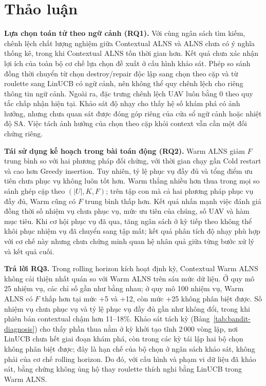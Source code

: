 \documentclass[11pt,a4paper]{article}
\begin{document}
\section{Thảo luận}\label{sec:discussion}
\textbf{Lựa chọn toán tử theo ngữ cảnh (RQ1).} Với cùng ngân sách tìm kiếm, chênh lệch chất lượng nghiệm giữa Contextual ALNS và ALNS chưa có ý nghĩa thống kê, trong khi Contextual ALNS tốn thời gian hơn. Kết quả chưa xác nhận lợi ích của toàn bộ cơ chế lựa chọn đề xuất ở cấu hình khảo sát. Phép so sánh đồng thời chuyển từ chọn destroy/repair độc lập sang chọn theo cặp và từ roulette sang LinUCB có ngữ cảnh, nên không thể quy chênh lệch cho riêng thông tin ngữ cảnh. Ngoài ra, đặc trưng chênh lệch UAV luôn bằng 0 theo quy tắc chấp nhận hiện tại. Khảo sát độ nhạy cho thấy hệ số khám phá có ảnh hưởng, nhưng chưa quan sát được đóng góp riêng của cửa sổ ngữ cảnh hoặc nhiệt độ SA. Việc tách ảnh hưởng của chọn theo cặp khỏi context vẫn cần một đối chứng riêng.

\textbf{Tái sử dụng kế hoạch trong bài toán động (RQ2).} Warm ALNS giảm $F$ trung bình so với hai phương pháp đối chứng, với thời gian chạy gần Cold restart và cao hơn Greedy insertion. Tuy nhiên, tỷ lệ phục vụ đầy đủ và tổng điểm ưu tiên chưa phục vụ không luôn tốt hơn. Warm thắng nhiều hơn thua trong mọi so sánh ghép cặp theo $(|U|,K,F)$; trên tập con mà cả hai phương pháp phục vụ đầy đủ, Warm cũng có $F$ trung bình thấp hơn. Kết quả nhấn mạnh việc đánh giá đồng thời số nhiệm vụ chưa phục vụ, mức ưu tiên của chúng, số UAV và hàm mục tiêu. Khi cơ hội phục vụ đã qua, tăng ngân sách ở kỳ tiếp theo không thể khôi phục nhiệm vụ đã chuyển sang tập mất; kết quả phân tích độ nhạy phù hợp với cơ chế này nhưng chưa chứng minh quan hệ nhân quả giữa từng bước xử lý và kết quả cuối.

\textbf{Trả lời RQ3.} Trong rolling horizon kích hoạt định kỳ, Contextual Warm ALNS không cải thiện nhất quán so với Warm ALNS trên sáu mức dữ liệu. Ở quy mô 25 nhiệm vụ, các chỉ số gần như bằng nhau; ở quy mô 100 nhiệm vụ, Warm ALNS có $F$ thấp hơn tại mức +5 và +12, còn mức +25 không phân biệt được. Số nhiệm vụ chưa phục vụ và tỷ lệ phục vụ đầy đủ gần như không đổi, trong khi phiên bản contextual chậm hơn 11--18\%. Khảo sát tách kỳ (Bảng~\ref{tab:bandit-diagnosis}) cho thấy phần thua nằm ở kỳ khởi tạo tĩnh 2\,000 vòng lặp, nơi LinUCB chưa hết giai đoạn khám phá, còn trong các kỳ tái lập hai bộ chọn không phân biệt được; đây là hạn chế của bộ chọn ở ngân sách khảo sát, không phải của cơ chế rolling horizon. Do đó, với cấu hình và phạm vi dữ liệu đã khảo sát, bằng chứng không ủng hộ thay roulette thích nghi bằng LinUCB trong Warm ALNS.
\end{document}
